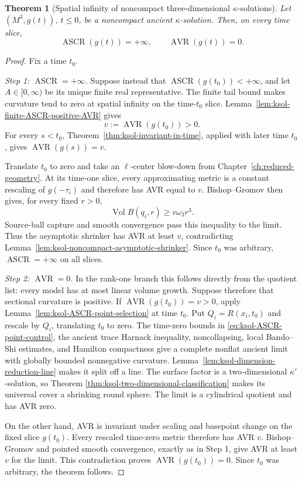 \documentclass[10pt]{coll-l}
\newtheorem{theorem}{Theorem}[chapter]
\theoremstyle{definition}
\theoremstyle{remark}
\numberwithin{section}{chapter}
\numberwithin{equation}{chapter}
\newcommand{\ASCR}{\operatorname{ASCR}}
\newcommand{\AVR}{\operatorname{AVR}}
\newcommand{\Vol}{\operatorname{Vol}}
\begin{document}
\begin{theorem}[Spatial infinity of noncompact three-dimensional
$\kappa$-solutions]
\label{thm:ksol-ASCR-AVR}
Let $(M^3,g(t))$, $t\leq0$, be a noncompact ancient $\kappa$-solution.
Then, on every time slice,
\begin{equation}
                 \ASCR(g(t))=+\infty,
                 \qquad \AVR(g(t))=0.                 \label{eq:ksol-ASCR-infty-AVR-zero}
\end{equation}
\end{theorem}

\begin{proof}
Fix a time $t_0$.

\emph{Step 1: $\ASCR=+\infty$.}
Suppose instead that $\ASCR(g(t_0))<+\infty$, and let $A\in[0,\infty)$ be
its unique finite real representative.  The finite tail bound makes
curvature tend to zero at spatial infinity on the
time-$t_0$ slice.  Lemma~\ref{lem:ksol-finite-ASCR-positive-AVR} gives
\[
                         v:=\AVR(g(t_0))>0.
\]
For every $s<t_0$, Theorem~\ref{thm:ksol-invariant-in-time}, applied with
later time $t_0$, gives $\AVR(g(s))=v$.

Translate $t_0$ to zero and take an $\ell$-center blow-down from
Chapter~\ref{ch:reduced-geometry}.
At its time-one slice, every approximating metric is a constant rescaling
of $g(-\tau_i)$ and therefore has AVR equal to $v$.  Bishop--Gromov
then gives, for every fixed $r>0$,
\[
 \Vol B(q_i,r)\geq v\omega_3r^3.
\]
Source-ball capture and smooth convergence pass this inequality to the
limit.  Thus the asymptotic shrinker has AVR at least $v$, contradicting
Lemma~\ref{lem:ksol-noncompact-asymptotic-shrinker}.  Since $t_0$ was
arbitrary, $\ASCR=+\infty$ on all slices.

\emph{Step 2: $\AVR=0$.}
In the rank-one branch this follows directly from the quotient list: every
model has at most linear volume growth.  Suppose therefore that sectional
curvature is positive.  If $\AVR(g(t_0))=v>0$, apply
Lemma~\ref{lem:ksol-ASCR-point-selection} at time $t_0$.  Put
$Q_i=R(x_i,t_0)$ and rescale by $Q_i$, translating $t_0$ to zero.  The
time-zero bounds in \eqref{eq:ksol-ASCR-point-control}, the ancient trace
Harnack inequality, noncollapsing, local Bando--Shi estimates, and Hamilton
compactness give a complete nonflat ancient limit with globally bounded
nonnegative curvature.  Lemma~\ref{lem:ksol-dimension-reduction-line}
makes it split off a line.  The surface factor is a two-dimensional
$\kappa'$-solution, so Theorem
\ref{thm:ksol-two-dimensional-classification} makes its universal cover a
shrinking round sphere.  The limit is a cylindrical quotient and has AVR
zero.

On the other hand, AVR is invariant under scaling and basepoint change on
the fixed slice $g(t_0)$.  Every rescaled time-zero metric therefore has AVR
$v$.  Bishop--Gromov and pointed smooth convergence, exactly as in Step 1,
give AVR at least $v$ for the limit.  This contradiction proves
$\AVR(g(t_0))=0$.  Since $t_0$ was arbitrary, the theorem follows.
\end{proof}
\end{document}
